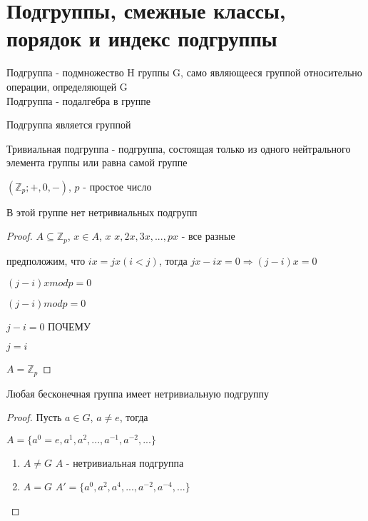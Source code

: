 \documentclass[../main/document.tex]{subfiles}
\begin{document}
\section{Подгруппы, смежные классы, порядок и индекс подгруппы}
\begin{dfn}[Подгруппа]
Подгруппа - подмножество H группы G, само являющееся группой относительно операции, определяющей G\\
Подгруппа - подалгебра в группе
\end{dfn}
\begin{cnsq}
Подгруппа является группой
\end{cnsq}
\begin{dfn}
Тривиальная подгруппа - подгруппа, состоящая только из одного нейтрального элемента группы или равна самой группе
\end{dfn}
\begin{exm}
\end{exm}
\begin{exm}
$(\mathbb{Z}_p;+,0,-)$, $p$ - простое число

В этой группе нет нетривиальных подгрупп
\begin{proof}
$A\subseteq \mathbb{Z}_p$, $x\in A$, $x$
$x,2x,3x,...,px$ - все разные

предположим, что $ix=jx (i<j)$, тогда $jx-ix=0\Rightarrow (j-i)x=0$

$(j-i)xmodp=0$

$(j-i)modp=0$

$j-i=0$ ПОЧЕМУ

$j=i$

$A=\mathbb{Z}_p$

\end{proof}
\end{exm}
\begin{thm}
Любая бесконечная группа имеет нетривиальную подгруппу
\begin{proof}
Пусть $a\in G$, $a\neq e$, тогда

$A=\{a^0=e, a^1,a^2,...,a^{-1},a^{-2},...\}$
\begin{enumerate}
\item $A\neq G$ $A$ - нетривиальная подгруппа
\item $A=G$ $A'=\{a^0,a^2,a^4,...,a^{-2},a^{-4},...\}$
\end{enumerate}
\end{proof}
\end{thm}
\end{document}
